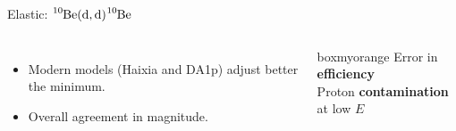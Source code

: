 \documentclass[sans,
frameno, %
mp,
usenames,dvipsnames, %
onlytextwidth, %
t,%
11pt]{beamer}
\newcommand{\iso}[2]{\ce{^{#1}#2}}
\begin{document}
\begin{frame}{Elastic: $\iso{10}{Be}(\textrm{d}, \textrm{d})\iso{10}{Be}$}
{\begin{figure}
\begin{minipage}[t]{0.48\linewidth}
            \end{minipage}
        \end{figure}
        \begin{columns}
            {
                \begin{itemize}
                    \item Modern models (Haixia and DA1p) adjust better the minimum.
                    \item Overall agreement in magnitude.
                \end{itemize}
            }\hfill
            {

                \begin{beamercolorbox}[sep=1ex, center, rounded=true]{boxmyorange}
                    Error in \textbf{efficiency} \\
                    \medskip
                    Proton \textbf{contamination} at low $E$
                \end{beamercolorbox}

}
\end{columns}}
\end{frame}
\end{document}

